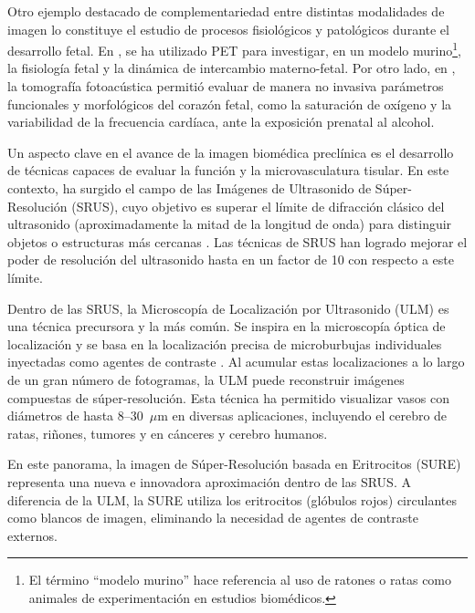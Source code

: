 \documentclass[10pt,a4paper]{article}
\begin{document}
Otro ejemplo destacado de complementariedad entre distintas modalidades de imagen lo constituye el estudio de procesos fisiológicos y patológicos durante el desarrollo fetal. En \cite{Torben2025}, se ha utilizado PET para investigar, en un modelo murino\footnote{El término “modelo murino” hace referencia al uso de ratones o ratas como animales de experimentación en estudios biomédicos.}, la fisiología fetal y la dinámica de intercambio materno-fetal. Por otro lado, en \cite{Tanvir2025}, la tomografía fotoacústica permitió evaluar de manera no invasiva parámetros funcionales y morfológicos del corazón fetal, como la saturación de oxígeno y la variabilidad de la frecuencia cardíaca, ante la exposición prenatal al alcohol.

Un aspecto clave en el avance de la imagen biomédica preclínica es el desarrollo de técnicas capaces de evaluar la función y la microvasculatura tisular. En este contexto, ha surgido el campo de las Imágenes de Ultrasonido de Súper-Resolución (SRUS), cuyo objetivo es superar el límite de difracción clásico del ultrasonido (aproximadamente la mitad de la longitud de onda) para distinguir objetos o estructuras más cercanas \cite{Christensen2020, Couture2018}. Las técnicas de SRUS han logrado mejorar el poder de resolución del ultrasonido hasta en un factor de 10 con respecto a este límite.

Dentro de las SRUS, la Microscopía de Localización por Ultrasonido (ULM) es una técnica precursora y la más común. Se inspira en la microscopía óptica de localización y se basa en la localización precisa de microburbujas individuales inyectadas como agentes de contraste \cite{Couture2018}. Al acumular estas localizaciones a lo largo de un gran número de fotogramas, la ULM puede reconstruir imágenes compuestas de súper-resolución. Esta técnica ha permitido visualizar vasos con diámetros de hasta 8--30~$\mu$m en diversas aplicaciones, incluyendo el cerebro de ratas, riñones, tumores y en cánceres y cerebro humanos. 

En este panorama, la imagen de Súper-Resolución basada en Eritrocitos (SURE) \cite{Jensen2024_SURE} representa una nueva e innovadora aproximación dentro de las SRUS. A diferencia de la ULM, la SURE utiliza los eritrocitos (glóbulos rojos) circulantes como blancos de imagen, eliminando la necesidad de agentes de contraste externos.
\end{document}
